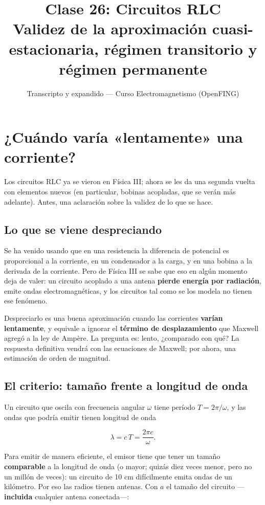 \documentclass[12pt,a4paper]{article}
\title{\textbf{Clase 26: Circuitos RLC} \\[0.3em]
        \large{Validez de la aproximación cuasi-estacionaria, régimen transitorio y régimen permanente}}
\author{Transcripto y expandido --- Curso Electromagnetismo (OpenFING)}
\date{}
\begin{document}
\maketitle
\thispagestyle{empty}
\newpage

\tableofcontents
\newpage

\section{¿Cuándo varía «lentamente» una corriente?}

Los circuitos RLC ya se vieron en Física III; ahora se les da una segunda
vuelta con elementos nuevos (en particular, bobinas acopladas, que se verán
más adelante). Antes, una aclaración sobre la validez de lo que se hace.

\subsection{Lo que se viene despreciando}

Se ha venido usando que en una resistencia la diferencia de potencial es
proporcional a la corriente, en un condensador a la carga, y en una bobina a la
derivada de la corriente. Pero de Física III se sabe que eso en algún momento
deja de valer: un circuito acoplado a una antena \textbf{pierde energía por
radiación}, emite ondas electromagnéticas, y los circuitos tal como se los
modela no tienen ese fenómeno.

Despreciarlo es una buena aproximación cuando las corrientes \textbf{varían
lentamente}, y equivale a ignorar el \textbf{término de desplazamiento} que Maxwell
agregó a la ley de Ampère. La pregunta es: lento, ¿comparado con qué? La
respuesta definitiva vendrá con las ecuaciones de Maxwell; por ahora, una
estimación de orden de magnitud.

\subsection{El criterio: tamaño frente a longitud de onda}

Un circuito que oscila con frecuencia angular $\omega$ tiene período
$T = 2\pi/\omega$, y las ondas que podría emitir tienen longitud de onda

\[
\lambda = c\,T = \frac{2\pi c}{\omega}.
\]

Para emitir de manera eficiente, el emisor tiene que tener un tamaño
\textbf{comparable} a la longitud de onda (o mayor; quizás diez veces menor, pero no
un millón de veces): un circuito de 10 cm difícilmente emita ondas de un
kilómetro. Por eso las radios tienen antenas. Con $a$ el tamaño del circuito
---\textbf{incluida} cualquier antena conectada---:
\end{document}
